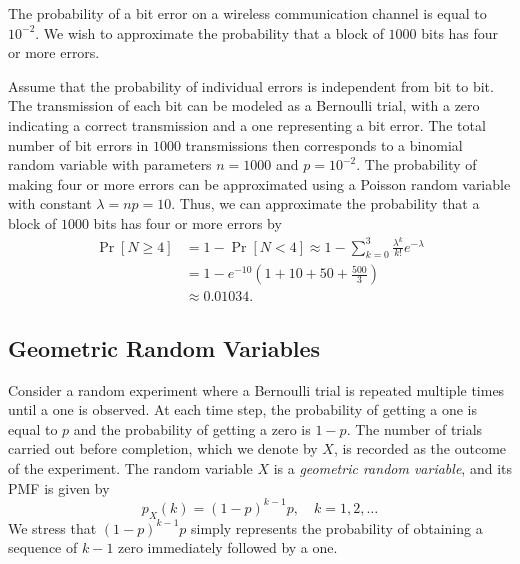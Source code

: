 \begin{example}
The probability of a bit error on a wireless communication channel is equal to $10^{-2}$.
We wish to approximate the probability that a block of $1000$ bits has four or more errors.

Assume that the probability of individual errors is independent from bit to bit.
The transmission of each bit can be modeled as a Bernoulli trial, with a zero indicating a correct transmission and a one representing a bit error.
The total number of bit errors in $1000$ transmissions then corresponds to a binomial random variable with parameters $n = 1000$ and $p = 10^{-2}$.
The probability of making four or more errors can be approximated using a Poisson random variable with constant $\lambda = np = 10$.
Thus, we can approximate the probability that a block of $1000$ bits has four or more errors by
\begin{equation*}
\begin{split}
\Pr [ N \geq 4 ] &= 1 - \Pr [ N < 4 ]
\approx 1 - \sum_{k=0}^3 \frac{\lambda^k}{k!} e^{-\lambda} \\
&= 1 - e^{-10} \left( 1 + 10 + 50 + \frac{500}{3} \right) \\
&\approx 0.01034 .
\end{split}
\end{equation*}
\end{example}


\subsection{Geometric Random Variables}

Consider a random experiment where a Bernoulli trial is repeated multiple times until a one is observed.
At each time step, the probability of getting a one is equal to $p$ and the probability of getting a zero is $1-p$.
The number of trials carried out before completion, which we denote by $X$, is recorded as the outcome of the experiment.
The random variable $X$ is a \emph{geometric random variable}, and its PMF is given by 
\begin{equation*}
p_X (k) = (1-p)^{k-1} p, \quad k = 1, 2, \ldots
\end{equation*}
We stress that $(1-p)^{k-1} p$ simply represents the probability of obtaining a sequence of $k-1$ zero immediately followed by a one.


